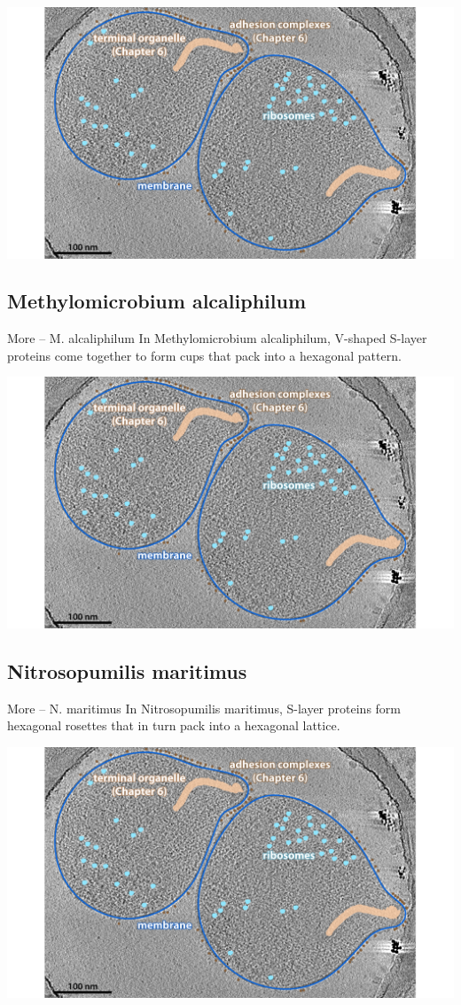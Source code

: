 \documentclass[]{tufte-book}
\begin{document}
\includegraphics{img/02_static/2_1_Mgenitalium}

\subsection{Methylomicrobium
alcaliphilum}\label{methylomicrobium-alcaliphilum}

More -- M. alcaliphilum In Methylomicrobium alcaliphilum, V-shaped
S-layer proteins come together to form cups that pack into a hexagonal
pattern.

\includegraphics{img/02_static/2_1_Mgenitalium}

\subsection{Nitrosopumilis maritimus}\label{nitrosopumilis-maritimus}

More -- N. maritimus In Nitrosopumilis maritimus, S-layer proteins form
hexagonal rosettes that in turn pack into a hexagonal lattice.

\includegraphics{img/02_static/2_1_Mgenitalium}
\end{document}
